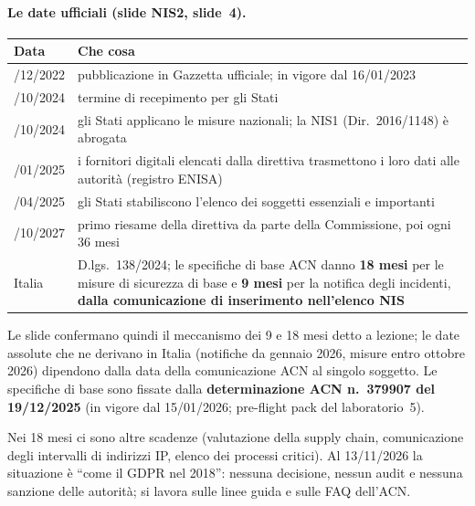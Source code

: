 \paragraph{Le date ufficiali (slide NIS2, slide~4).}
\begin{center}
\small
\begin{tabularx}{\linewidth}{>{\raggedright\arraybackslash}p{3.6cm} X}
\toprule
\textbf{Data} & \textbf{Che cosa}\\
\midrule
27/12/2022 & pubblicazione in Gazzetta ufficiale; in vigore dal 16/01/2023\\
17/10/2024 & termine di recepimento per gli Stati\\
18/10/2024 & gli Stati applicano le misure nazionali; la NIS1 (Dir.~2016/1148) è abrogata\\
17/01/2025 & i fornitori digitali elencati dalla direttiva trasmettono i loro dati alle autorità
  (registro ENISA)\\
17/04/2025 & gli Stati stabiliscono l'elenco dei soggetti essenziali e importanti\\
17/10/2027 & primo riesame della direttiva da parte della Commissione, poi ogni 36 mesi\\
Italia & D.lgs.~138/2024; le specifiche di base ACN danno \textbf{18 mesi} per le misure di sicurezza
  di base e \textbf{9 mesi} per la notifica degli incidenti, \textbf{dalla comunicazione di inserimento
  nell'elenco NIS}\\
\bottomrule
\end{tabularx}
\end{center}
Le slide confermano quindi il meccanismo dei 9 e 18 mesi detto a lezione; le date assolute che ne
derivano in Italia (notifiche da gennaio 2026, misure entro ottobre 2026) dipendono dalla data della
comunicazione ACN al singolo soggetto. Le specifiche di base sono fissate dalla \textbf{determinazione
ACN n.~379907 del 19/12/2025} (in vigore dal 15/01/2026; pre-flight pack del laboratorio~5).

Nei 18 mesi ci sono altre scadenze (valutazione della supply chain, comunicazione degli intervalli di
indirizzi IP, elenco dei processi critici). Al 13/11/2026 la situazione è ``come il GDPR nel 2018'':
nessuna decisione, nessun audit e nessuna sanzione delle autorità; si lavora sulle linee guida e sulle
FAQ dell'ACN.

